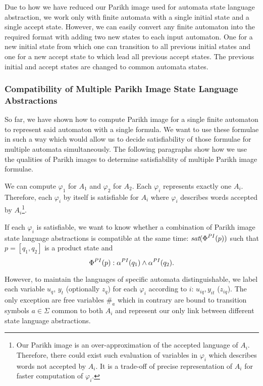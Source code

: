 Due to how we have reduced our Parikh image used for automata state language abstraction, we work only with finite automata with a single initial state and a single accept state. However, we can easily convert any finite automaton into the required format with adding two new states to each input automaton. One for a new initial state from which one can transition to all previous initial states and one for a new accept state to which lead all previous accept states. The previous initial and accept states are changed to common automata states.


\subsubsection{Compatibility of Multiple Parikh Image State Language Abstractions}

So far, we have shown how to compute Parikh image for a single finite automaton to represent said automaton with a single formula. We want to use these formulae in such a way which would allow us to decide satisfiability of those formulae for multiple automata simultaneously. The following paragraphs show how we use the qualities of Parikh images to determine satisfiability of multiple Parikh image formulae.

We can compute $\varphi_1$ for $A_1$ and $\varphi_2$ for $A_2$. Each $\varphi_i$ represents exactly one $A_i$. Therefore, each $\varphi_i$ by itself is satisfiable for $A_i$ where $\varphi_i$ describes words accepted by $A_i$\footnote{Our Parikh image is an over-approximation of the accepted language of $A_i$. Therefore, there could exist such evaluation of variables in $\varphi_i$ which describes words not accepted by $A_i$. It is a trade-off of precise representation of $A_i$ for faster computation of $\varphi_i$.}.

If each $\varphi_i$ is satisfiable, we want to know whether a combination of Parikh image state language abstractions is compatible at the same time: $\emph{sat}(\emph{$\Phi$}^{PI}(p))$ such that $p = [q_1, q_2]$ is a product state and
\[
    \emph{$\Phi$}^{PI}(p) : \alpha^{PI}(q_1) \wedge \alpha^{PI}(q_2) \text{.}
\]

However, to maintain the languages of specific automata distinguishable, we label each variable $u_q$, $y_t$ (optionally $z_q$) for each $\varphi_i$ according to $i$: $u_{iq}, y_{it}$ ($z_{iq}$). The only exception are free variables $\#_a$ which in contrary are bound to transition symbols $a \in \Sigma$ common to both $A_i$ and represent our only link between different state language abstractions.

